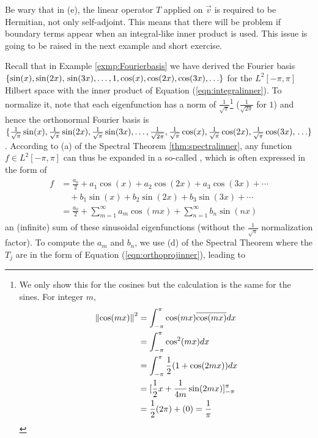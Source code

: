 Be wary that in (e), the linear operator $T$ applied on $\vec{v}$ is required to be Hermitian, not only self-adjoint. This means that there will be problem if boundary terms appear when an integral-like inner product is used. This issue is going to be raised in the next example and short exercise.\par

Recall that in Example \ref{exmp:Fourierbasis} we have derived the Fourier basis $\{\sin(x), \sin(2x), \\ \sin(3x), \ldots, 1, \cos(x), \cos(2x), \cos(3x), \ldots\}$ for the $L^2[-\pi, \pi]$ Hilbert space with the inner product of Equation (\ref{eqn:integralinner}). To normalize it, note that each eigenfunction has a norm of $\frac{1}{\sqrt{\pi}}$\footnote{We only show this for the cosines but the calculation is the same for the sines. For integer $m$,
\begin{align*}
\norm{\cos(mx)}^2 &= \int_{-\pi}^{\pi} \cos(mx)\overline{\cos(mx)} dx \\
&= \int_{-\pi}^{\pi} \cos^2(mx) dx \\
&= \int_{-\pi}^{\pi} \frac{1}{2}(1 + \cos(2mx)) dx \\
&= [\frac{1}{2}x + \frac{1}{4m}\sin(2mx)]_{-\pi}^{\pi} \\
&= \frac{1}{2}(2\pi) + (0) = \frac{1}{\pi}
\end{align*}
} ($\frac{1}{\sqrt{2\pi}}$ for $1$) and hence the orthonormal Fourier basis is $\{\frac{1}{\sqrt{\pi}}\sin(x), \frac{1}{\sqrt{\pi}}\sin(2x), \frac{1}{\sqrt{\pi}}\sin(3x), \ldots, \frac{1}{\sqrt{2\pi}}, \frac{1}{\sqrt{\pi}}\cos(x), \frac{1}{\sqrt{\pi}}\cos(2x), \frac{1}{\sqrt{\pi}}\cos(3x), \\ \ldots\}$. According to (a) of the Spectral Theorem \ref{thm:spectralinner}, any function $f \in L^2[-\pi, \pi]$ can thus be expanded in a so-called , which is often expressed in the form of
\begin{align}
\begin{aligned}
f &= \frac{a_0}{2} + a_1\cos(x) + a_2\cos(2x) + a_3\cos(3x) + \cdots \\
&\quad + b_1\sin(x) + b_2\sin(2x) + b_3\sin(3x) + \cdots \\
&= \frac{a_0}{2} + \sum_{m=1}^{\infty} a_m \cos(mx) + \sum_{n=1}^{\infty} b_n \sin(nx) 
\end{aligned} \label{eqn:fourierseries}
\end{align}
an (infinite) sum of these sinusoidal eigenfunctions (without the $\frac{1}{\sqrt{\pi}}$ normalization factor). To compute the  $a_m$ and $b_n$, we use (d) of the Spectral Theorem where the $T_j$ are in the form of Equation (\ref{eqn:orthoprojinner}), leading to
